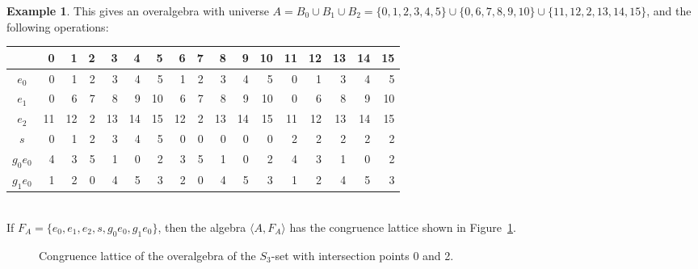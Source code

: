 \documentclass[cm,dissertation]{uhthesis}
\theoremstyle{plain}
\theoremstyle{definition}
\newtheorem{example}[theorem]{Example}
\theoremstyle{remark}
\numberwithin{theorem}{section}
\numberwithin{claim}{chapter}
\numberwithin{equation}{section}
\numberwithin{conjecture}{chapter}
\newcommand{\<}{\ensuremath{\langle}}
\renewcommand{\>}{\ensuremath{\rangle}}
\newcommand{\0}{\ensuremath{\mathbf{0}}}
\newcommand{\1}{\ensuremath{\mathbf{1}}}
\newcommand{\2}{\ensuremath{\mathbf{2}}}
\newcommand{\3}{\ensuremath{\mathbf{3}}}
\newcommand{\4}{\ensuremath{\mathbf{4}}}
\newcommand{\5}{\ensuremath{\mathbf{5}}}
\begin{document}
\begin{example}
  \noindent This gives an
  overalgebra with universe $A = B_0 \cup B_1 \cup B_2 = \{ 0, 1, 2, 3, 4, 5\} \cup
  \{0, 6, 7, 8, 9, 10\} \cup\{ 11, 12, 2, 13, 14, 15\}$,
  and the following operations:
  \\[-5pt]
  \begin{center}
    {\small 
      \begin{tabular}{c|r|r|r|r|r|r|r|r|r|r|r|r|r|r|r|r}
        &0&1&2&3&4&5&6&7&8&9&10&11&12&13&14&15\\
        \hline
        $e_0$ & 0& 1& 2& 3& 4& 5& 1& 2& 3& 4& 5& 0& 1& 3& 4& 5\\
        $e_1$ & 0& 6& 7& 8& 9& 10& 6& 7& 8& 9& 10& 0& 6& 8& 9& 10\\
        $e_2$ &11& 12& 2& 13& 14& 15& 12& 2& 13& 14& 15& 11& 12& 13& 14& 15\\
        $s$  & 0& 1& 2& 3& 4& 5& 0& 0& 0& 0& 0& 2& 2& 2& 2& 2\\
        $g_0 e_0$ &4& 3& 5& 1& 0& 2& 3& 5& 1& 0& 2& 4& 3& 1& 0& 2\\
        $g_1 e_0$& 1& 2& 0& 4& 5& 3& 2& 0& 4& 5& 3& 1& 2& 4& 5& 3
    \end{tabular}}
  \end{center}
  ~\\[4pt]
  \noindent If %
  $F_A=\{e_0, e_1, e_2, s, g_0 e_0, g_1 e_0\}$, then the
  algebra $\<A, F_A\>$ has the congruence lattice shown in Figure~\ref{fig:OverAlgebra-S3-0-2}.
  \begin{figure}[h!]
    \centering
    \caption{Congruence lattice of the overalgebra of the $S_3$-set with
      intersection points 0 and 2.}
    \label{fig:OverAlgebra-S3-0-2}
  \end{figure}


\end{example}
\end{document}
